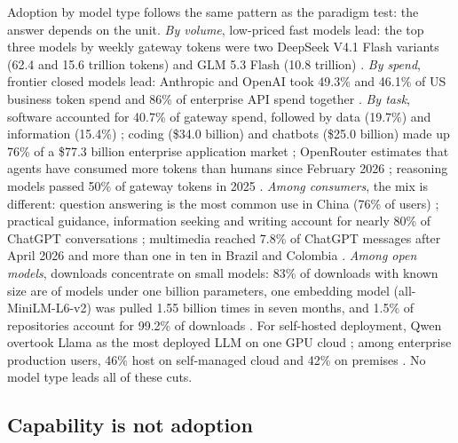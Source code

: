 \documentclass[11pt]{article}
\begin{document}
Adoption by model type follows the same pattern as the paradigm test: the answer depends on the unit. \emph{By volume}, low-priced fast models lead: the top three models by weekly gateway tokens were two DeepSeek V4.1 Flash variants (62.4 and 15.6 trillion tokens) and GLM 5.3 Flash (10.8 trillion) \cite{openrouter2026rankings}. \emph{By spend}, frontier closed models lead: Anthropic and OpenAI took 49.3\% and 46.1\% of US business token spend \cite{ramp2026index} and 86\% of enterprise API spend together \cite{menlo2026state}. \emph{By task}, software accounted for 40.7\% of gateway spend, followed by data (19.7\%) and information (15.4\%) \cite{openrouter2026rankings}; coding (\$34.0 billion) and chatbots (\$25.0 billion) made up 76\% of a \$77.3 billion enterprise application market \cite{menlo2026state}; OpenRouter estimates that agents have consumed more tokens than humans since February 2026 \cite{openrouter2026tokens}; reasoning models passed 50\% of gateway tokens in 2025 \cite{aubakirova2026state}. \emph{Among consumers}, the mix is different: question answering is the most common use in China (76\% of users) \cite{cnnic2026genai}; practical guidance, information seeking and writing account for nearly 80\% of ChatGPT conversations \cite{chatterji2025how}; multimedia reached 7.8\% of ChatGPT messages after April 2026 and more than one in ten in Brazil and Colombia \cite{openai2026work}. \emph{Among open models}, downloads concentrate on small models: 83\% of downloads with known size are of models under one billion parameters, one embedding model (all-MiniLM-L6-v2) was pulled 1.55 billion times in seven months, and 1.5\% of repositories account for 99.2\% of downloads \cite{hf2026summer}. For self-hosted deployment, Qwen overtook Llama as the most deployed LLM on one GPU cloud \cite{newstack2026runpod}; among enterprise production users, 46\% host on self-managed cloud and 42\% on premises \cite{futurum2026open}. No model type leads all of these cuts.

\subsection{Capability is not adoption}
\label{sec:capability}
\end{document}
